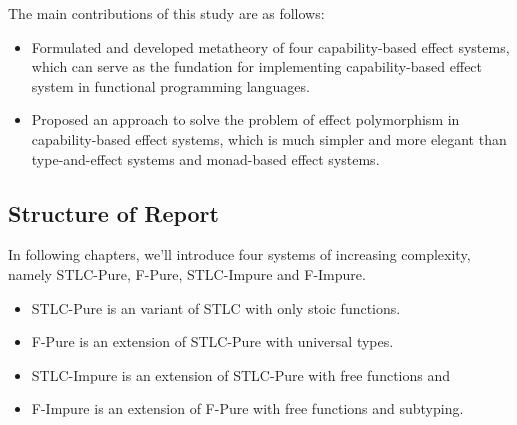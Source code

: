 The main contributions of this study are as follows:

\begin{itemize}
\item Formulated and developed metatheory of four capability-based
  effect systems, which can serve as the fundation for implementing
  capability-based effect system in functional programming languages.
\item Proposed an approach to solve the problem of effect polymorphism
  in capability-based effect systems, which is much simpler and more
  elegant than type-and-effect systems and monad-based effect systems.
\end{itemize}

\subsection{Structure of Report}

In following chapters, we'll introduce four systems of increasing
complexity, namely STLC-Pure, F-Pure, STLC-Impure and F-Impure.

\begin{itemize}
\item STLC-Pure is an variant of STLC with only stoic functions.
\item F-Pure is an extension of STLC-Pure with universal types.
\item STLC-Impure is an extension of STLC-Pure with free functions and
\item F-Impure is an extension of F-Pure with free functions and
  subtyping.
\end{itemize}
